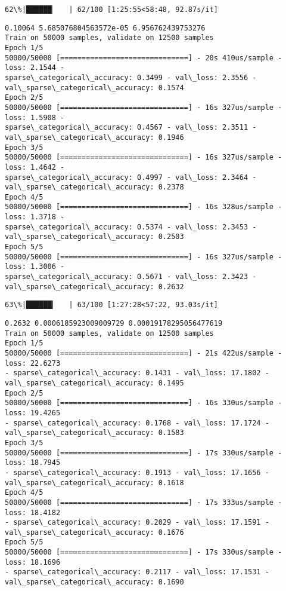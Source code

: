 \documentclass[11pt]{article}
\begin{document}
    \begin{Verbatim}[commandchars=\\\{\}]
 62\%|██████▏   | 62/100 [1:25:55<58:48, 92.87s/it]
    \end{Verbatim}

    \begin{Verbatim}[commandchars=\\\{\}]
0.10064 5.685076804563572e-05 6.956762439753276
Train on 50000 samples, validate on 12500 samples
Epoch 1/5
50000/50000 [==============================] - 20s 410us/sample - loss: 2.1544 -
sparse\_categorical\_accuracy: 0.3499 - val\_loss: 2.3556 -
val\_sparse\_categorical\_accuracy: 0.1574
Epoch 2/5
50000/50000 [==============================] - 16s 327us/sample - loss: 1.5908 -
sparse\_categorical\_accuracy: 0.4567 - val\_loss: 2.3511 -
val\_sparse\_categorical\_accuracy: 0.1946
Epoch 3/5
50000/50000 [==============================] - 16s 327us/sample - loss: 1.4642 -
sparse\_categorical\_accuracy: 0.4997 - val\_loss: 2.3464 -
val\_sparse\_categorical\_accuracy: 0.2378
Epoch 4/5
50000/50000 [==============================] - 16s 328us/sample - loss: 1.3718 -
sparse\_categorical\_accuracy: 0.5374 - val\_loss: 2.3453 -
val\_sparse\_categorical\_accuracy: 0.2503
Epoch 5/5
50000/50000 [==============================] - 16s 327us/sample - loss: 1.3006 -
sparse\_categorical\_accuracy: 0.5671 - val\_loss: 2.3423 -
val\_sparse\_categorical\_accuracy: 0.2632
    \end{Verbatim}

    \begin{Verbatim}[commandchars=\\\{\}]
 63\%|██████▎   | 63/100 [1:27:28<57:22, 93.03s/it]
    \end{Verbatim}

    \begin{Verbatim}[commandchars=\\\{\}]
0.2632 0.0006185923009009729 0.00019178295056477619
Train on 50000 samples, validate on 12500 samples
Epoch 1/5
50000/50000 [==============================] - 21s 422us/sample - loss: 22.6273
- sparse\_categorical\_accuracy: 0.1431 - val\_loss: 17.1802 -
val\_sparse\_categorical\_accuracy: 0.1495
Epoch 2/5
50000/50000 [==============================] - 16s 330us/sample - loss: 19.4265
- sparse\_categorical\_accuracy: 0.1768 - val\_loss: 17.1724 -
val\_sparse\_categorical\_accuracy: 0.1583
Epoch 3/5
50000/50000 [==============================] - 17s 330us/sample - loss: 18.7945
- sparse\_categorical\_accuracy: 0.1913 - val\_loss: 17.1656 -
val\_sparse\_categorical\_accuracy: 0.1618
Epoch 4/5
50000/50000 [==============================] - 17s 333us/sample - loss: 18.4182
- sparse\_categorical\_accuracy: 0.2029 - val\_loss: 17.1591 -
val\_sparse\_categorical\_accuracy: 0.1676
Epoch 5/5
50000/50000 [==============================] - 17s 330us/sample - loss: 18.1696
- sparse\_categorical\_accuracy: 0.2117 - val\_loss: 17.1531 -
val\_sparse\_categorical\_accuracy: 0.1690
    \end{Verbatim}
\end{document}
